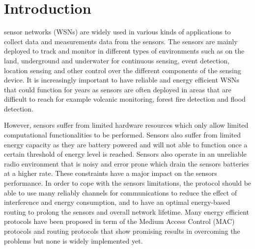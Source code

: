\section{Introduction}

% 
% 
% 
% 

 sensor networks (WSNs) are widely used in various kinds of applications to collect data and measurements data from the sensors. 
The sensors are mainly deployed to track and monitor in different types of environments such as on the land, underground and underwater for continuous sensing, event detection, location sensing and other control over the different components of the sensing device. 
It is increasingly important to have reliable and energy efficient WSNs that could function for years as sensors are often deployed in areas that are difficult to reach for example volcanic monitoring, forest fire detection and flood detection.

However, sensors suffer from limited hardware resources which only allow limited computational functionalities to be performed. Sensors also suffer from limited energy capacity as they are battery powered and will not able to function once a certain threshold of energy level is reached. 
Sensors also operate in an unreliable radio environment that is noisy and error prone which drain the sensors batteries at a higher rate. These constraints have a major impact on the sensors performance. 
In order to cope with the sensors limitations, the protocol should be able to use many reliably channels for communications to reduce the effect of interference and energy consumption, and to have an optimal energy-based routing to prolong the sensors and overall network lifetime.
Many energy efficient protocols have been proposed in term of the Medium Access Control (MAC) protocols and routing protocols that show promising results in overcoming the problems but none is widely implemented yet.

